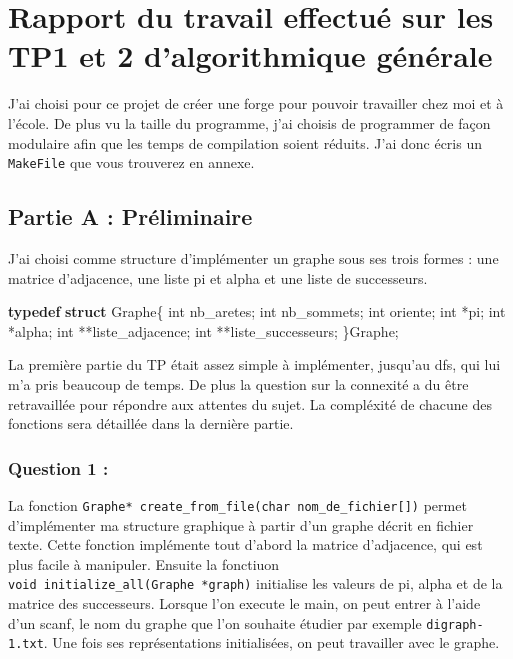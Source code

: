 \documentclass[]{article}
\title{}
\author{}
\date{}
\newenvironment{Shaded}{}{}
\newcommand{\KeywordTok}[1]{\textcolor[rgb]{0.00,0.44,0.13}{\textbf{{#1}}}}
\newcommand{\DataTypeTok}[1]{\textcolor[rgb]{0.56,0.13,0.00}{{#1}}}
\newcommand{\NormalTok}[1]{{#1}}
\begin{document}
\section{Rapport du travail effectué sur les TP1 et 2 d'algorithmique
générale}\label{rapport-du-travail-effectue-sur-les-tp1-et-2-dalgorithmique-generale}

J'ai choisi pour ce projet de créer une forge pour pouvoir travailler
chez moi et à l'école. De plus vu la taille du programme, j'ai choisis
de programmer de façon modulaire afin que les temps de compilation
soient réduits. J'ai donc écris un \texttt{MakeFile} que vous trouverez
en annexe.

\subsection{Partie A : Préliminaire}\label{partie-a-preliminaire}

J'ai choisi comme structure d'implémenter un graphe sous ses trois
formes : une matrice d'adjacence, une liste pi et alpha et une liste de
successeurs.

\begin{Shaded}
\begin{Highlighting}[]
\KeywordTok{typedef} \KeywordTok{struct} \NormalTok{Graphe\{}
    \DataTypeTok{int} \NormalTok{nb_aretes;}
    \DataTypeTok{int} \NormalTok{nb_sommets;}
    \DataTypeTok{int} \NormalTok{oriente;}
    \DataTypeTok{int} \NormalTok{*pi;}
    \DataTypeTok{int} \NormalTok{*alpha;}
    \DataTypeTok{int} \NormalTok{**liste_adjacence;}
    \DataTypeTok{int} \NormalTok{**liste_successeurs;}
\NormalTok{\}Graphe;}
\end{Highlighting}
\end{Shaded}

La première partie du TP était assez simple à implémenter, jusqu'au dfs,
qui lui m'a pris beaucoup de temps. De plus la question sur la connexité
a du être retravaillée pour répondre aux attentes du sujet. La
compléxité de chacune des fonctions sera détaillée dans la dernière
partie.

\subsubsection{Question 1 :}\label{question-1}

La fonction
\texttt{Graphe*\ create\_from\_file(char\ nom\_de\_fichier{[}{]})}
permet d'implémenter ma structure graphique à partir d'un graphe décrit
en fichier texte. Cette fonction implémente tout d'abord la matrice
d'adjacence, qui est plus facile à manipuler. Ensuite la fonctiuon
\texttt{void\ initialize\_all(Graphe\ *graph)} initialise les valeurs de
pi, alpha et de la matrice des successeurs. Lorsque l'on execute le
main, on peut entrer à l'aide d'un scanf, le nom du graphe que l'on
souhaite étudier par exemple \texttt{digraph-1.txt}. Une fois ses
représentations initialisées, on peut travailler avec le graphe.
\end{document}
